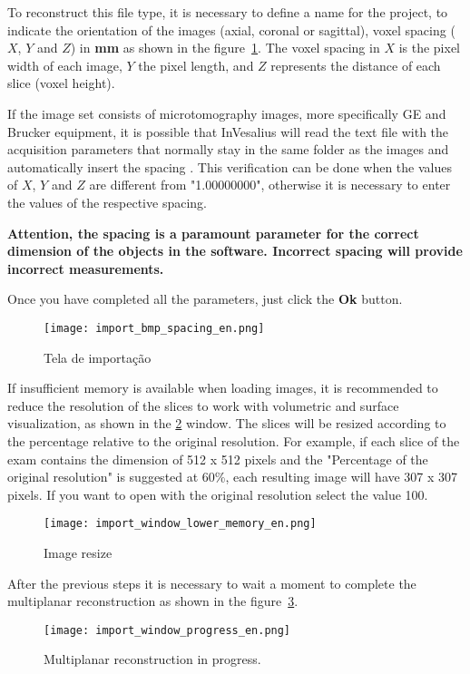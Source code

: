 To reconstruct this file type, it is necessary to define a name for the project, to indicate the orientation of the images (axial, coronal or sagittal), voxel spacing ($X$, $Y$ and $Z$) in \textbf{mm} as shown in the figure~\ref{fig:import_bmp_spacing_pt}. The voxel spacing in $X$ is the pixel width of each image, $Y$ the pixel length, and $Z$ represents the distance of each slice (voxel height).

If the image set consists of microtomography images, more specifically GE and Brucker equipment, it is possible that InVesalius will read the text file with the acquisition parameters that normally stay in the same folder as the images and automatically insert the spacing . This verification can be done when the values of $X$, $Y$ and $Z$ are different from "1.00000000", otherwise it is necessary to enter the values of the respective spacing.

\textbf{Attention, the spacing is a paramount parameter for the correct dimension of the objects in the software. Incorrect spacing will provide incorrect measurements.}

Once you have completed all the parameters, just click the \textbf{Ok} button.

\begin{figure}[!htb]
\centering
\texttt{[image: import\_bmp\_spacing\_en.png]}
\caption{Tela de importação}
\label{fig:import_bmp_spacing_pt}
\end{figure}

If insufficient memory is available when loading images, it is recommended to reduce the resolution of the slices to work with volumetric and surface visualization, as shown in the \ref{fig:import_bmp_resize_pt} window. The slices will be resized according to the percentage relative to the original resolution. For example, if each slice of the exam contains the dimension of 512 x 512 pixels and the "Percentage of the original resolution" is suggested at 60\%, each resulting image will have 307 x 307 pixels. If you want to open with the original resolution select the value 100.

\begin{figure}[!htb]
\centering
\texttt{[image: import\_window\_lower\_memory\_en.png]}
\caption{Image resize}
\label{fig:import_bmp_resize_pt}
\end{figure}


After the previous steps it is necessary to wait a moment to complete the multiplanar reconstruction as shown in the figure~\ref{fig:import_bmp_mpr_pt.png}.

\begin{figure}[!htb]
\centering
\texttt{[image: import\_window\_progress\_en.png]}
\caption{Multiplanar reconstruction in progress.}
\label{fig:import_bmp_mpr_pt.png}
\end{figure}